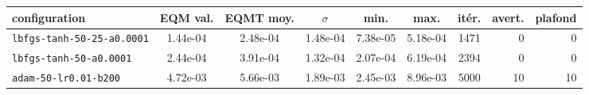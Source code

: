 \begin{tabular}{l S[table-format=1.2e-2] S[table-format=1.2e-2] S[table-format=1.2e-2] S[table-format=1.2e-2] S[table-format=1.2e-2] S[table-format=4] r r}
\toprule
{configuration} & {EQM val.} & {EQMT moy.} & {\(\sigma\)} & {min.} & {max.} & {it\'er.} & {avert.} & {plafond} \\
\midrule
\texttt{lbfgs-tanh-50-25-a0.0001} & 1.44e-04 & 2.48e-04 & 1.48e-04 & 7.38e-05 & 5.18e-04 & 1471 & 0 & 0 \\
\texttt{lbfgs-tanh-50-a0.0001} & 2.44e-04 & 3.91e-04 & 1.32e-04 & 2.07e-04 & 6.19e-04 & 2394 & 0 & 0 \\
\texttt{adam-50-lr0.01-b200} & 4.72e-03 & 5.66e-03 & 1.89e-03 & 2.45e-03 & 8.96e-03 & 5000 & 10 & 10 \\
\bottomrule
\end{tabular}
